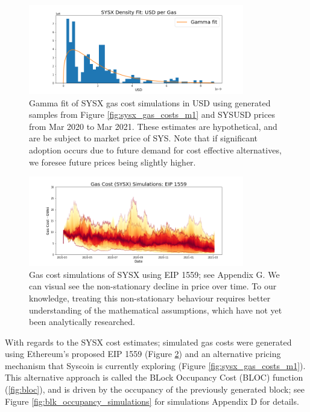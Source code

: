 \documentclass[peerreview]{ieeesyscoin}
\begin{document}
\begin{figure}[h!]
\includegraphics[width=3.7in]{img/sysx_usd_density.png}
\caption{Gamma fit of SYSX gas cost simulations in USD using generated samples from Figure \ref{fig:sysx_gas_costs_m1} and SYSUSD prices from Mar 2020 to Mar 2021. These estimates are hypothetical, and are be subject to market price of SYS. Note that if significant adoption occurs due to future demand for cost effective alternatives, we foresee future prices being slightly higher.} 
\label{fig:sysx_usd_density}
\end{figure} 

\begin{figure}[h!]
\includegraphics[width=3.7in]{img/sysx_gas_costs_eip_1559.png}
\caption{Gas cost simulations of SYSX using EIP 1559; see Appendix G. We can visual see the non-stationary decline in price over time. To our knowledge, treating this non-stationary behaviour requires better understanding of the mathematical assumptions, which have not yet been analytically researched.} 
\label{fig:sysx_gas_costs_eip_1559}
\end{figure} 

With regards to the SYSX cost estimates; simulated gas costs were generated using Ethereum's proposed EIP 1559 (Figure \ref{fig:sysx_gas_costs_eip_1559}) and an alternative pricing mechanism that Syscoin is currently exploring (Figure \ref{fig:sysx_gas_costs_m1}). This alternative approach is called the BLock Occupancy Cost (BLOC) function (\ref{fig:bloc}), and is driven by the occupancy of the previously generated block; see Figure \ref{fig:blk_occupancy_simulations} for simulations Appendix D for details.
\end{document}
